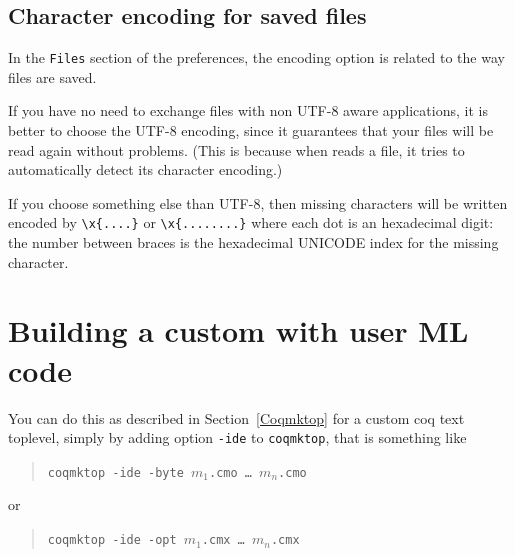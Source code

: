 \subsection{Character encoding for saved files}
\label{sec:coqidecharencoding}

In the \texttt{Files} section of the preferences, the encoding option
is related to the way files are saved. 

If you have no need to exchange files with non UTF-8 aware
applications, it is better to choose the UTF-8 encoding, since it
guarantees that your files will be read again without problems. (This
is because when \CoqIDE{} reads a file, it tries to automatically
detect its character encoding.) 

If you choose something else than UTF-8, then missing characters will
be written encoded by \verb|\x{....}| or \verb|\x{........}| where
each dot is an hexadecimal digit: the number between braces is the
hexadecimal UNICODE index for the missing character.


\section{Building a custom \CoqIDE{} with user \textsc{ML} code}

You can do this as described in Section~\ref{Coqmktop} for a
custom coq text toplevel, simply by adding 
option \verb|-ide| to \verb|coqmktop|, that is something like
\begin{quote}
\texttt{coqmktop -ide -byte $m_1$.cmo \ldots{} $m_n$.cmo}
\end{quote}
or 
\begin{quote}
\texttt{coqmktop -ide -opt $m_1$.cmx \ldots{} $m_n$.cmx}
\end{quote}

    


